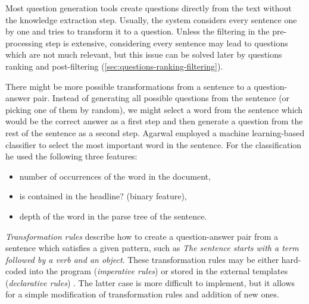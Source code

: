 \documentclass[12pt, twoside]{fithesis2}
\renewcommand{\_}{\leavevmode \kern0.07em\vbox{\hrule width0.4em}}
\newcommand{\squarebullet}{\textcolor{black}{\raisebox{0.15em}{\rule{4pt}{4pt}}}}
\newcommand{\emptysquarebullet}{\textcolor{black}{\raisebox{0.10em}{\tiny$\square$}}}
\newenvironment{myItemize}{
  \begin{itemize}[leftmargin=2em,rightmargin=1em,itemsep=\parskip ,parsep=0em,topsep=0em,partopsep=0em]
  \renewcommand{\labelitemi}{\squarebullet}
  \renewcommand{\labelitemii}{\textbullet}
}{
  \end{itemize}
}
\begin{document}
Most question generation tools create questions directly from the text without the knowledge extraction step.
Usually, the system considers every sentence one by one
and tries to transform it to a question.
Unless the filtering in the pre-processing step is extensive,
considering every sentence may lead to questions which are not much relevant,
but this issue can be solved later by questions ranking and post-filtering
(\autoref{sec:questions-ranking-filtering}).

There might be more possible transformations from a sentence to a question-answer pair.
Instead of generating all possible questions from the sentence (or picking one of them by random),
we might select a word from the sentence which would be the correct answer as a first step and then generate a question from the rest of the sentence as a second step.
Agarwal \cite{question-gen-textbooks} employed a machine learning-based classifier to select the most important word in the sentence. For the classification he used the following three features:
\begin{myItemize}
\item number of occurrences of the word in the document,
\item is contained in the headline? (binary feature),
\item depth of the word in the parse tree of the sentence.
\end{myItemize}

\textit{Transformation rules} describe how to create a question-answer pair from a sentence
which satisfies a given pattern,
such as \textit{The sentence starts with a term followed by a verb and an object}.
These transformation rules may be either hard-coded into the program (\textit{imperative rules})
\cite{questions-wolfe, question-overgenerating-rating, question-gen-connectives}
or stored in the external templates (\textit{declarative rules})
\cite{question-gen-ceist, questions-eval}.
The latter case is more difficult to implement, but it allows for a simple modification of transformation rules and addition of new ones.
\end{document}
